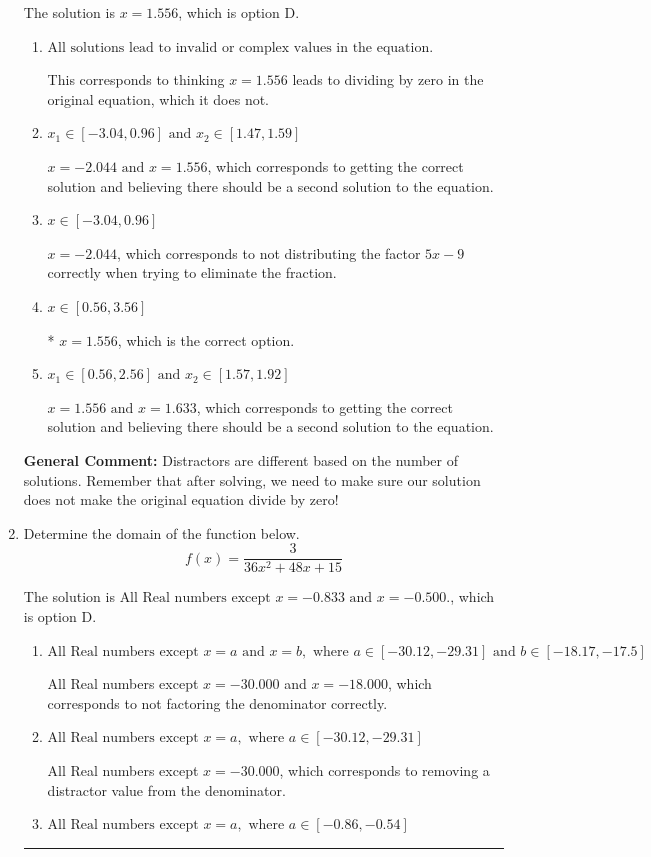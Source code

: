 \documentclass{extbook}[14pt]
\newcommand{\litem}[1]{\item #1

\rule{\textwidth}{0.4pt}}
\begin{document}
\begin{enumerate}
{The solution is \( x = 1.556 \), which is option D.\begin{enumerate}[label=\Alph*.]
\item \( \text{All solutions lead to invalid or complex values in the equation.} \)

This corresponds to thinking $x = 1.556$ leads to dividing by zero in the original equation, which it does not.
\item \( x_1 \in [-3.04, 0.96] \text{ and } x_2 \in [1.47,1.59] \)

$x = -2.044 \text{ and } x = 1.556$, which corresponds to getting the correct solution and believing there should be a second solution to the equation.
\item \( x \in [-3.04,0.96] \)

$x = -2.044$, which corresponds to not distributing the factor $5x -9$ correctly when trying to eliminate the fraction.
\item \( x \in [0.56,3.56] \)

* $x = 1.556$, which is the correct option.
\item \( x_1 \in [0.56, 2.56] \text{ and } x_2 \in [1.57,1.92] \)

$x = 1.556 \text{ and } x = 1.633$, which corresponds to getting the correct solution and believing there should be a second solution to the equation.
\end{enumerate}

\textbf{General Comment:} Distractors are different based on the number of solutions. Remember that after solving, we need to make sure our solution does not make the original equation divide by zero!
}
\litem{
Determine the domain of the function below.
\[ f(x) = \frac{3}{36x^{2} +48 x + 15} \]

The solution is \( \text{All Real numbers except } x = -0.833 \text{ and } x = -0.500. \), which is option D.\begin{enumerate}[label=\Alph*.]
\item \( \text{All Real numbers except } x = a \text{ and } x = b, \text{ where } a \in [-30.12, -29.31] \text{ and } b \in [-18.17, -17.5] \)

All Real numbers except $x = -30.000$ and $x = -18.000$, which corresponds to not factoring the denominator correctly.
\item \( \text{All Real numbers except } x = a, \text{ where } a \in [-30.12, -29.31] \)

All Real numbers except $x = -30.000$, which corresponds to removing a distractor value from the denominator.
\item \( \text{All Real numbers except } x = a, \text{ where } a \in [-0.86, -0.54] \)


\end{enumerate}}
\end{enumerate}
\end{document}
